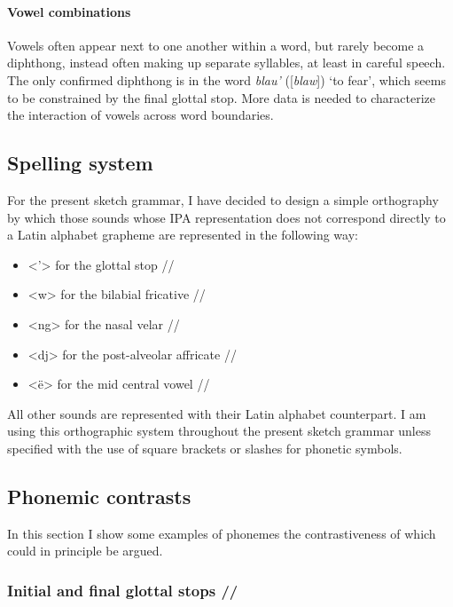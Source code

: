 \documentclass{article}
\begin{document}
\paragraph{Vowel combinations}

Vowels often appear next to one another within a word, but rarely become a diphthong, instead often making up separate syllables, at least in careful speech. The only confirmed diphthong is in the word \textit{blau'} ([\textit{blaw\textglotstop}]) `to fear', which seems to be constrained by the final glottal stop. More data is needed to characterize the interaction of vowels across word boundaries.


\subsection{Spelling system}\label{sec:spel}

For the present sketch grammar, I have decided to design a simple orthography by which those sounds whose IPA representation does not correspond directly to a Latin alphabet grapheme are represented in the following way:

\begin{itemize}

\item <'> for the glottal stop /\textglotstop /
\item <w> for the bilabial fricative /\textbeta /
\item <ng> for the nasal velar //
\item <dj> for the post-alveolar affricate //
\item <ë> for the mid central vowel /\textschwa /

\end{itemize}

All other sounds are represented with their Latin alphabet counterpart. I am using this orthographic system throughout the present sketch grammar unless specified with the use of square brackets or slashes for phonetic symbols.

\subsection{Phonemic contrasts}\label{sec:contr}

In this section I show some examples of phonemes the contrastiveness of which could in principle be argued.

\subsubsection{Initial and final glottal stops /\textglotstop/}
\end{document}
